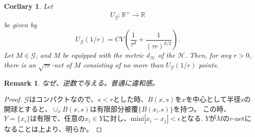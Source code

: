 \documentclass{jarticle}
\newtheorem{cor}[thm]{Corllary}
\newtheorem*{rem}{Remark}
\begin{document}
\begin{cor} Let
  \begin{equation*}
   U_{\mathcal{G}}:\mathbb{R}^{+} \to \mathbb{R}
  \end{equation*}
be given by
\begin{equation*}
 U_{\mathcal{G}}(1/r) = CV ( \frac{ 1 }{\tau^d }  + \frac{ 1 }{ (\tau r)^{d/2} }).
\end{equation*}
Let $M \in \mathcal{G}$, and $M$ be equipped with the metric $d_{\mathcal{H}}$ of the $\mathcal{H}$.
Then, for any $r >0$, there is an $\sqrt{\tau r}$-net of $M$ consisting of no more than $U_{\mathcal{G}}(1/r)$ points.
\end{cor}
\begin{rem}
 なぜ、逆数で与える。普通に違和感。
\end{rem}

\begin{proof}
  $\mathcal{G}$はコンパクトなので、$ s < r$とした時、$B(x,s)$を$x$を中心として半径$s$の開球とすると、$\cup_x B(x,s)$は有限部分被覆$\{ B(x_i.s) \}$を持つ。
  この時、$Y=\{ x_i \}$は有限で、任意の$x_i \in Y$に対し、$\mathrm{mini}|x_ i -x_j| < \epsilon$となる.
  $Y$が$M$の$r$-netになることは上より、明らか。
\end{proof}
\end{document}
